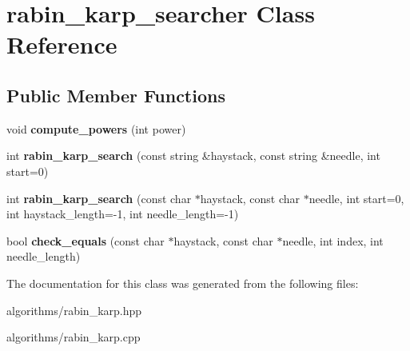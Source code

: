 \hypertarget{classrabin__karp__searcher}{\section{rabin\+\_\+karp\+\_\+searcher Class Reference}
\label{classrabin__karp__searcher}
}
\subsection*{Public Member Functions}
\begin{DoxyCompactItemize}
\item 
\hypertarget{classrabin__karp__searcher_af87b49667bfaae8aa9e04c40a56ef65d}{void {\bfseries compute\+\_\+powers} (int power)}\label{classrabin__karp__searcher_af87b49667bfaae8aa9e04c40a56ef65d}

\item 
\hypertarget{classrabin__karp__searcher_a8e84f35d889d207d2e1d8f1667b096f1}{int {\bfseries rabin\+\_\+karp\+\_\+search} (const string \&haystack, const string \&needle, int start=0)}\label{classrabin__karp__searcher_a8e84f35d889d207d2e1d8f1667b096f1}

\item 
\hypertarget{classrabin__karp__searcher_a463e7806633823f5e0b337d5751c0941}{int {\bfseries rabin\+\_\+karp\+\_\+search} (const char $\ast$haystack, const char $\ast$needle, int start=0, int haystack\+\_\+length=-\/1, int needle\+\_\+length=-\/1)}\label{classrabin__karp__searcher_a463e7806633823f5e0b337d5751c0941}

\item 
\hypertarget{classrabin__karp__searcher_abfdd295c35e50777268b2c93c0d63cf1}{bool {\bfseries check\+\_\+equals} (const char $\ast$haystack, const char $\ast$needle, int index, int needle\+\_\+length)}\label{classrabin__karp__searcher_abfdd295c35e50777268b2c93c0d63cf1}

\end{DoxyCompactItemize}


The documentation for this class was generated from the following files\+:\begin{DoxyCompactItemize}
\item 
algorithms/rabin\+\_\+karp.\+hpp\item 
algorithms/rabin\+\_\+karp.\+cpp\end{DoxyCompactItemize}
